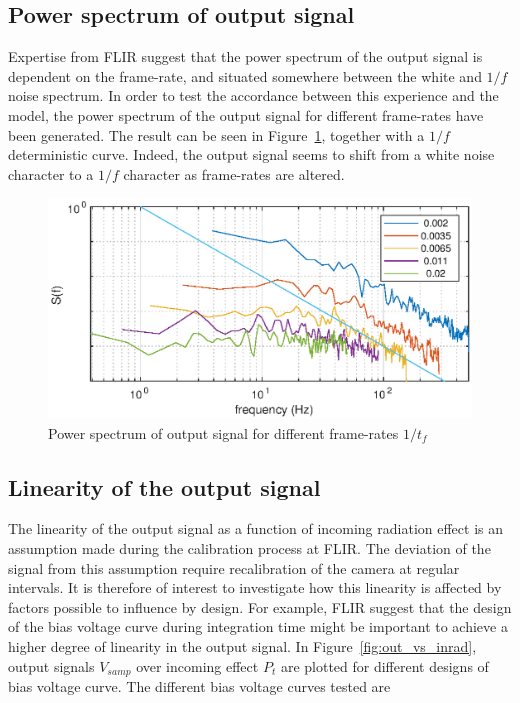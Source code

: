 \subsection{Power spectrum of output signal}
Expertise from FLIR suggest that the power spectrum of the output signal is dependent on the frame-rate, and situated somewhere between the white and $1/f$ noise spectrum.
In order to test the accordance between this experience and the model, the power spectrum of the output signal for different frame-rates have been generated. The result can be seen in  
Figure~\ref{fig:pspec}, together with a $1/f$ deterministic curve. Indeed, the output signal seems to shift from a white noise character to a $1/f$ character as frame-rates are altered.
\begin{figure}[H]
 \begin{center}
\includegraphics[scale=0.9]{gfx/pspec.eps} 	 
  \caption{Power spectrum of output signal for different frame-rates $1/t_f$}
  \label{fig:pspec}
  \end{center}
\end{figure}

\subsection{Linearity of the output signal}
The linearity of the output signal as a function of incoming radiation effect is an assumption made during the calibration process at FLIR. The deviation of the signal from this assumption
require recalibration of the camera at regular intervals. It is therefore of interest to investigate how this linearity is affected by factors possible to influence by design. For example, FLIR suggest that the design of the bias voltage curve during integration time might be important to achieve a higher degree of linearity in the output signal. In Figure~\ref{fig:out_vs_inrad}, output signals $V_{samp}$ over incoming effect $P_{t}$ are plotted for different designs of bias voltage curve. The different bias voltage curves tested are

